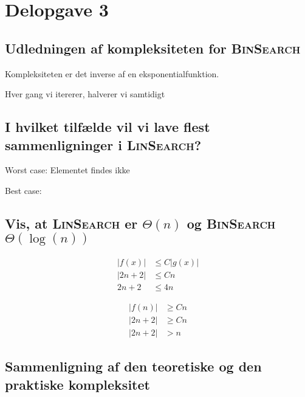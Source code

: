 \section{Delopgave 3}\label{sec:delopgave-32}

\subsection{Udledningen af kompleksiteten for \textsc{BinSearch}}
\label{subsec:udledningen-af-kompleksiteten-for-binsearch}

Kompleksiteten er det inverse af en eksponentialfunktion.

Hver gang vi itererer, halverer vi samtidigt

\subsection{I hvilket tilfælde vil vi lave flest sammenligninger i \textsc{LinSearch}?}
\label{subsec:i-hvilket-tilflde-vil-vi-lave-flest-sammenligninger-i-linsearch}

Worst case: Elementet findes ikke

Best case:

\subsection{Vis, at \textsc{LinSearch} er \(\Theta(n)\) og \textsc{BinSearch} \(\Theta(\log(n))\)}
\label{subsec:vis-at-linsearch-er-theta-n-og-binsearch-theta-log-n}

\begin{equation}
    \begin{aligned}
        | f(x) | & \leq C | g(x) | \\
        | 2n + 2 | & \leq Cn \\
        2n + 2 & \leq 4n
    \end{aligned}\label{eq:equation13}
\end{equation}

\begin{equation}
    \begin{aligned}
        | f(n) | & \geq Cn \\
        | 2n + 2 | & \geq Cn \\
        | 2n + 2 | & > n
    \end{aligned}\label{eq:equation14}
\end{equation}

\subsection{Sammenligning af den teoretiske og den praktiske kompleksitet}
\label{subsec:sammenligning-af-den-teoretiske-og-den-praktiske-kompleksitet}

